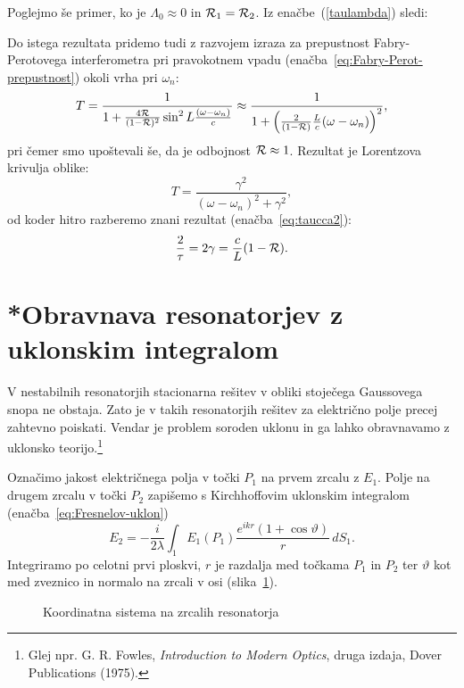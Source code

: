 Poglejmo še primer, ko je $\Lambda_0 \approx 0$ in ${\cal R}_1 = {\cal R}_2$.
Iz enačbe~(\ref{taulambda}) sledi:

Do istega rezultata pridemo tudi z razvojem izraza za prepustnost Fabry-Perotovega 
interferometra pri pravokotnem vpadu (enačba~\ref{eq:Fabry-Perot-prepustnost}) okoli vrha pri $\omega_{n}$:
\begin{equation}
T=\frac{1}{1+\frac{4{\cal R}}{(1-{\cal R})^{2}}\sin^{2}L\frac{(\omega-\omega_{n})}{c}}\approx 
\frac{1}{1+\left(\frac{2}{(1-{\cal R})}\frac{L}{c}(\omega-\omega_{n})\right)^{2}},
\label{3.27}
\end{equation}
pri čemer smo upoštevali še, da je odbojnost ${\cal R} \approx 1$. 
Rezultat je Lorentzova krivulja oblike:
 \begin{equation}
 T = \frac{\gamma^2}{(\omega - \omega_n)^2+\gamma^2},
 \label{eq:FBi2}
 \end{equation}
od koder hitro razberemo znani rezultat (enačba~\ref{eq:taucca2}):
\begin{equation}
\frac{2}{\tau}=2\gamma = \frac{c}{L}(1-{\cal R}).
\end{equation}

\section{*Obravnava resonatorjev z uklonskim integralom}
\label{Resonator_uklon}

V nestabilnih resonatorjih stacionarna rešitev v obliki stoječega
Gaussovega snopa ne obstaja. Zato je v takih resonatorjih rešitev za električno polje precej
zahtevno poiskati. Vendar je problem soroden uklonu in ga lahko obravnavamo z 
uklonsko teorijo.\footnote{Glej npr. G. R. Fowles, {\it 
Introduction to Modern Optics}, druga izdaja, Dover Publications (1975).}

Označimo jakost električnega polja v točki $P_{1}$ na prvem zrcalu z $E_{1}$.
Polje na drugem zrcalu v točki $P_2$ zapišemo s Kirchhoffovim uklonskim
integralom (enačba~\ref{eq:Fresnelov-uklon})
\begin{equation}
E_{2} =  -\frac{i}{2\lambda}\int_{1}E_{1}(P_{1})\frac{e^{ikr}(1+\cos\vartheta)}{r}\, dS_{1}.
\label{eq:resuklon}
\end{equation}
Integriramo po celotni prvi ploskvi, $r$ je razdalja med točkama $P_{1}$ in $P_{2}$ ter $\vartheta$
kot med zveznico in normalo na zrcali v osi (slika~\ref{fig:uklon_res_shema}). 
\begin{figure}[ht]
\centering
\def\svgwidth{90truemm} 

\caption{Koordinatna sistema na zrcalih resonatorja}
\label{fig:uklon_res_shema}
\end{figure}

